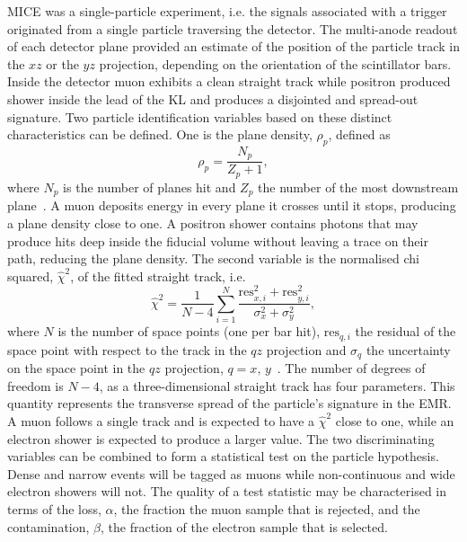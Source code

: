 MICE was a single-particle experiment, i.e. the signals associated with a trigger originated from a single particle traversing the detector. The multi-anode readout of each detector plane provided an estimate of the position of the particle track in the $xz$ or the $yz$ projection, depending on the orientation of the scintillator bars.
Inside the detector muon exhibits a clean straight track while positron produced shower inside the lead of the KL and produces a disjointed and spread-out signature. 
Two particle identification variables based on these distinct characteristics can be defined. One is the plane density, $\rho_p$, defined as
\begin{equation}
\rho_p = \frac{N_p}{Z_p+1},
\end{equation}
where $N_p$ is the number of planes hit and $Z_p$ the number of the most downstream plane~\cite{2015JInst..10P2012A}. A muon deposits energy in every plane it crosses until it stops, producing a plane density close to one. A positron shower contains photons that may produce hits deep inside the fiducial volume without leaving a trace on their path, reducing the plane density. The second variable is the normalised chi squared, $\hat{\chi}^2$, of the fitted straight track, i.e.
\begin{equation}
\hat{\chi}^2=\frac{1}{N-4}\sum_{i=1}^{N}\frac{\text{res}_{x,i}^2+\text{res}_{y,i}^2}{\sigma_x^2+\sigma_y^2},
\end{equation}
where $N$ is the number of space points (one per bar hit), $\text{res}_{q,i}$ the residual of the space point with respect to the track in the $qz$ projection and $\sigma_q$ the uncertainty on the space point in the $qz$ projection, $q=x,\,y$~\cite{Drielsma:thesis}. The number of degrees of freedom is $N-4$, as a three-dimensional straight track has four parameters. This quantity represents the transverse spread of the particle's signature in the EMR. A muon follows a single track and is expected to have a $\hat{\chi}^2$ close to one, while an electron shower is expected to produce a larger value.
The two discriminating variables can be combined to form a statistical test on the particle hypothesis.
Dense and narrow events will be tagged as muons while non-continuous and wide electron showers will not. 
The quality of a test statistic may be characterised in terms of the loss, $\alpha$, the fraction the muon sample that is rejected, and the contamination, $\beta$, the fraction of the electron sample that is selected.

